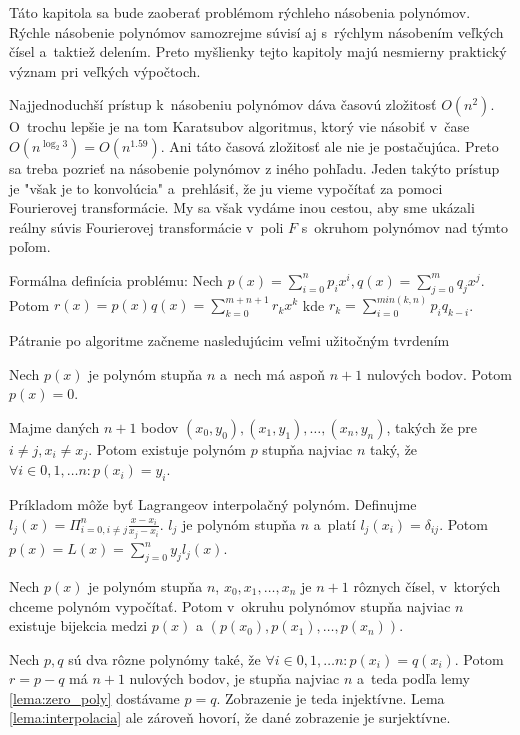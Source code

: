 Táto kapitola sa bude zaoberať problémom rýchleho násobenia polynómov.
Rýchle násobenie polynómov samozrejme súvisí aj s~rýchlym násobením
veľkých čísel a~taktiež delením. Preto myšlienky tejto kapitoly majú
 nesmierny praktický význam pri veľkých výpočtoch.


Najjednoduchší prístup k~násobeniu polynómov dáva časovú zložitosť
$O(n^2)$. O~trochu lepšie je na tom Karatsubov algoritmus, ktorý vie
násobiť v~čase $O(n^{\log_{2}3})=O(n^{1.59})$. Ani táto časová
zložitosť ale nie je postačujúca. Preto sa treba pozrieť na násobenie
polynómov z iného pohľadu. Jeden takýto prístup je "však je to konvolúcia"
a~prehlásiť, že ju vieme vypočítať za pomoci Fourierovej
transformácie. My sa však vydáme inou cestou, aby sme ukázali reálny
súvis Fourierovej transformácie v~poli $F$ s~okruhom polynómov nad
týmto poľom.

Formálna definícia problému:
Nech $p(x)=\sum_{i=0}^{n} p_i x^i, q(x) = \sum_{j=0}^{m} q_j x^j$.
Potom $r(x) = p(x) q(x) = \sum_{k=0}^{m+n+1} r_k x^k$ kde
$r_k = \sum_{i=0}^{min(k,n)} p_i q_{k-i}$.

Pátranie po algoritme začneme nasledujúcim veľmi užitočným tvrdením
\begin{lema}
 Nech $p(x)$ je polynóm stupňa $n$ a~nech má aspoň $n+1$ nulových
 bodov. Potom $p(x)=0$.
 \label{lema:zero_poly}
\end{lema}

\begin{lema}[O~interpolácii]
 Majme daných $n+1$ bodov $(x_0,y_0), (x_1,y_1), \dots, (x_n,y_n)$,
 takých že pre $i\not=j, x_i\not=x_j$.
 Potom existuje polynóm $p$ stupňa najviac $n$ taký, že
 $\forall i\in 0,1,\dots n: p(x_i)=y_i$.
\label{lema:interpolacia}
\end{lema}
\begin{dokaz}
 Príkladom môže byť Lagrangeov interpolačný polynóm.
 Definujme $l_j(x) = \Pi_{i=0,i\not=j}^{n} \frac{x-x_i}{x_j-x_i}$.
 $l_j$ je polynóm stupňa $n$ a~platí $l_j(x_i) = \delta_{ij}$.
 Potom $p(x) = L(x) = \sum_{j=0}^{n} y_j l_j(x)$.
\end{dokaz}

\begin{lema}
Nech $p(x)$ je polynóm stupňa $n$, $x_0,x_1,\dots,x_n$ je $n+1$
rôznych čísel, v~ktorých chceme polynóm vypočítať.
Potom v~okruhu polynómov stupňa najviac $n$ existuje bijekcia medzi $p(x)$
a $(p(x_0),p(x_1),\dots,p(x_{n}))$.
\end{lema}
\begin{dokaz}
Nech $p,q$ sú dva rôzne polynómy také, že $\forall i\in 0,1,\dots n:
p(x_i) = q(x_i)$. Potom $r=p-q$ má $n+1$ nulových bodov, je stupňa
najviac $n$ a~teda podľa lemy \ref{lema:zero_poly} dostávame $p=q$.
Zobrazenie je teda injektívne. Lema \ref{lema:interpolacia} ale
zároveň hovorí, že dané zobrazenie je surjektívne.
\end{dokaz}

